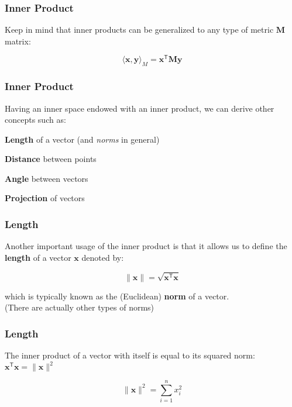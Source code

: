 \documentclass[12pt]{beamer}\usepackage[]{graphicx}\usepackage[]{color}
\begin{document}

\begin{frame}
\frametitle{Inner Product}

Keep in mind that inner products can be generalized to any type of 
metric $\mathbf{M}$ matrix:

{\Large
$$
\langle \mathbf{x}, \mathbf{y} \rangle_{M} = \mathbf{x^{\mathsf{T}} M y}
$$
}

\end{frame}


\begin{frame}
\frametitle{Inner Product}

Having an inner space endowed with an inner product, we can derive other concepts such as:

\bbi
  \item \textbf{Length} of a vector (and \textit{norms} in general)
  \item \textbf{Distance} between points
  \item \textbf{Angle} between vectors
  \item \textbf{Projection} of vectors
\ei

\end{frame}


\begin{frame}
\frametitle{Length}

Another important usage of the inner product is that it allows us to define the 
\textbf{length} of a vector $\mathbf{x}$ denoted by:

{\Large
$$
\| \mathbf{x} \| = \sqrt{\mathbf{x^\mathsf{T} x}}
$$
}

which is typically known as the (Euclidean) \textbf{norm} of a vector. \\
{\lolit (There are actually other types of norms)}

\end{frame}


\begin{frame}
\frametitle{Length}

The inner product of a vector with itself is equal to 
its squared norm: $\mathbf{x^\mathsf{T} x} = \| \mathbf{x} \|^2$

{\Large
$$
\| \mathbf{x} \|^2 = \sum_{i=1}^{n} x_{i}^{2}
$$
}

\end{frame}
\end{document}

